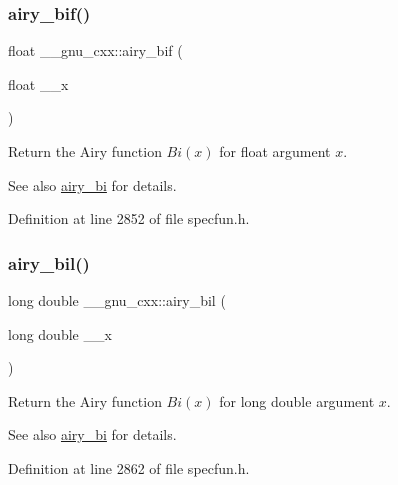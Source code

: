 \subsubsection{\texorpdfstring{airy\+\_\+bif()}{airy\_bif()}}
{\footnotesize\ttfamily float \+\_\+\+\_\+gnu\+\_\+cxx\+::airy\+\_\+bif (\begin{DoxyParamCaption}\item[{float}]{\+\_\+\+\_\+x }\end{DoxyParamCaption})\hspace{0.3cm}{\ttfamily [inline]}}

Return the Airy function $ Bi(x) $ for {\ttfamily float} argument $ x $.

\begin{DoxySeeAlso}{See also}
\hyperlink{group__gnu__math__spec__func_ga33c172cab7f8e9c99537444c7e30801a}{airy\+\_\+bi} for details. 
\end{DoxySeeAlso}


Definition at line 2852 of file specfun.\+h.

\mbox{\label{group__gnu__math__spec__func_ga59240b3f40177e5187f3f194f624f0f8}} 
\subsubsection{\texorpdfstring{airy\+\_\+bil()}{airy\_bil()}}
{\footnotesize\ttfamily long double \+\_\+\+\_\+gnu\+\_\+cxx\+::airy\+\_\+bil (\begin{DoxyParamCaption}\item[{long double}]{\+\_\+\+\_\+x }\end{DoxyParamCaption})\hspace{0.3cm}{\ttfamily [inline]}}

Return the Airy function $ Bi(x) $ for {\ttfamily long double} argument $ x $.

\begin{DoxySeeAlso}{See also}
\hyperlink{group__gnu__math__spec__func_ga33c172cab7f8e9c99537444c7e30801a}{airy\+\_\+bi} for details. 
\end{DoxySeeAlso}


Definition at line 2862 of file specfun.\+h.

